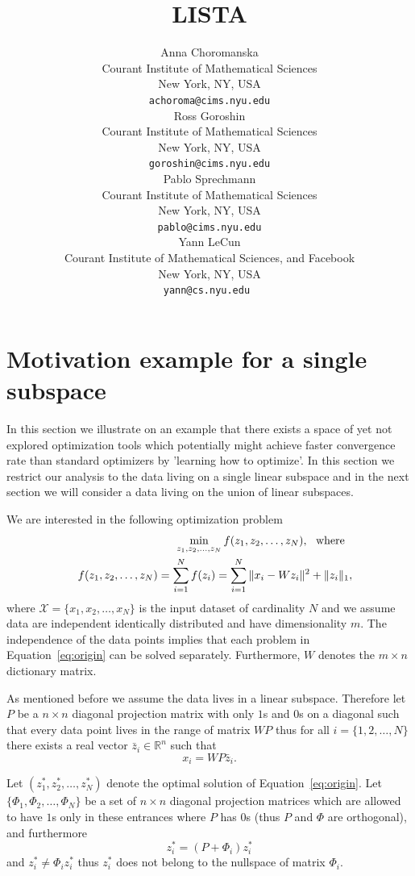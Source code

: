 \documentclass{article} %
\title{LISTA}
\author{
Anna Choromanska \\
Courant Institute of Mathematical Sciences \\
New York, NY, USA \\
\texttt{achoroma@cims.nyu.edu} \\
\And
Ross Goroshin \\
Courant Institute of Mathematical Sciences \\
New York, NY, USA \\
\texttt{goroshin@cims.nyu.edu} \\
\And
Pablo Sprechmann \\
Courant Institute of Mathematical Sciences \\
New York, NY, USA \\
\texttt{pablo@cims.nyu.edu} \\
\AND
Yann LeCun \\
Courant Institute of Mathematical Sciences, and Facebook\\
New York, NY, USA \\
\texttt{yann@cs.nyu.edu } 
}
\begin{document}
\maketitle

\begin{abstract}
\end{abstract}

\section{Motivation example for a single subspace}
In this section we illustrate on an example that there exists a space of yet not explored optimization tools which potentially might achieve faster convergence rate than standard optimizers by 'learning how to optimize'. In this section we restrict our analysis to the data living on a single linear subspace and in the next section we will consider a data living on the union of linear subspaces.

We are interested in the following optimization problem
\begin{eqnarray}
&&\min_{z_1,z_2,\dots,z_N} f(z_1,z_2,\dots,z_N),\text{\:\:\:where\:\:\:} \nonumber\\
&&f(z_1,z_2,\dots,z_N) = \sum_{i=1}^Nf(z_i) = \sum_{i=1}^N\|x_i - Wz_i\|^2 + \|z_i\|_1,
\label{eq:origin}
\end{eqnarray}
where $\mathcal{X} = \{x_1,x_2,\dots,x_N\}$ is the input dataset of cardinality $N$ and we assume data are independent identically distributed and have dimensionality $m$. The independence of the data points implies that each problem in Equation~\ref{eq:origin} can be solved separately. Furthermore, $W$ denotes the $m\times n$ dictionary matrix. 

As mentioned before we assume the data lives in a linear subspace. Therefore let $P$ be a $n \times n$ diagonal projection matrix with only $1$s and $0$s on a diagonal such that every data point lives in the range of matrix $WP$ thus for all $i = \{1,2,\dots,N\}$ there exists a real vector $\bar{z}_i \in \mathbb{R}^n$ such that
\[x_i = WP\bar{z}_i.
\]

Let $(z^{*}_1,z^{*}_2,\dots,z^{*}_N)$ denote the optimal solution of Equation~\ref{eq:origin}. Let $\{\Phi_1,\Phi_2,\dots,\Phi_N\}$ be a set of $n \times n$ diagonal projection matrices which are allowed to have $1$s only in these entrances where $P$ has $0$s (thus $P$ and $\Phi$ are orthogonal), and furthermore
\[z^{*}_i = (P + \Phi_i)z^{*}_i
\]
and $z^{*}_i \neq \Phi_i z^{*}_i$ thus $z^{*}_i$ does not belong to the nullspace of matrix $\Phi_i$.
\end{document}
